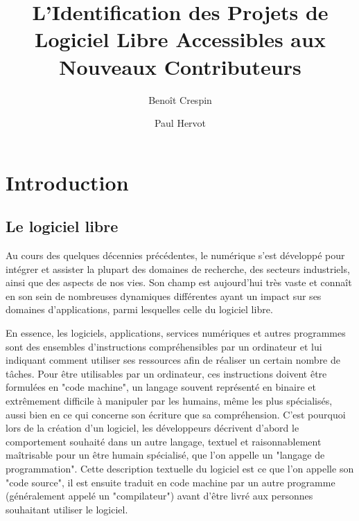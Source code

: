 \documentclass[twocolumn,dvipsnames]{llncs}
\title{L'Identification des Projets de Logiciel Libre Accessibles aux Nouveaux Contributeurs}
\author{%
    \todo[inline]{TODO: anonymiser les auteurs pour la soumission initiale}
    Benoît Crespin\inst{1}\orcidID{0000-0002-9105-0243}%
    \and%
    Paul Hervot\inst{1}%
}
\institute{Université de Strasbourg}
\begin{document}
    \maketitle

    \begin{abstract}
    \end{abstract}

    \section{Introduction}
    \subsection{Le logiciel libre}
    Au cours des quelques décennies précédentes, le numérique s'est développé
    pour intégrer et assister la plupart des domaines de recherche, des secteurs
    industriels, ainsi que des aspects de nos vies. Son champ est aujourd'hui
    très vaste et connaît en son sein de nombreuses dynamiques différentes ayant
    un impact sur ses domaines d'applications, parmi lesquelles celle du
    logiciel libre.

    En essence, les logiciels, applications, services numériques et autres
    programmes sont des ensembles d'instructions compréhensibles par un
    ordinateur et lui indiquant comment utiliser ses ressources afin de réaliser
    un certain nombre de tâches. Pour être utilisables par un ordinateur, ces
    instructions doivent être formulées en "code machine", un langage souvent
    représenté en binaire et extrêmement difficile à manipuler par les humains,
    même les plus spécialisés, aussi bien en ce qui concerne son écriture que sa
    compréhension. C'est pourquoi lors de la création d'un logiciel, les
    développeurs décrivent d'abord le comportement souhaité dans un autre
    langage, textuel et raisonnablement maîtrisable pour un être humain
    spécialisé, que l'on appelle un "langage de programmation". Cette
    description textuelle du logiciel est ce que l'on appelle son "code source",
    il est ensuite traduit en code machine par un autre programme (généralement
    appelé un "compilateur") avant d'être livré aux personnes souhaitant
    utiliser le logiciel.
\end{document}
